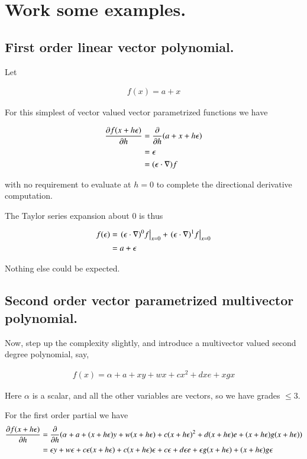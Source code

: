 \documentclass{article}
\begin{document}
\section{ Work some examples. }

\subsection{ First order linear vector polynomial. }

Let

\begin{align*}
f(x) = a + x
\end{align*}

For this simplest of vector valued vector parametrized functions we have

\begin{align*}
\PD{h}{f(x + h \epsilon)} 
&= \PD{h}{} (a + x + h \epsilon) \\
&= \epsilon \\
&= (\epsilon \cdot \grad) f
\end{align*}

with no requirement to evaluate at $h=0$ to complete the directional derivative computation.

The Taylor series expansion about $0$ is thus

\begin{align*}
f(\epsilon) 
&= \left. (\epsilon \cdot \grad)^0 f \right\vert_{x=0} + \left. (\epsilon \cdot \grad)^1 f  \right\vert_{x=0} \\
&= a + \epsilon \\
\end{align*}

Nothing else could be expected.

\subsection{ Second order vector parametrized multivector polynomial. }

Now, step up the complexity slightly, and introduce a multivector valued second degree polynomial, say,

\begin{align}\label{eqn:secondOrder}
f(x) = \alpha + a + x y + w x + c x^2 + d x e + x g x
\end{align}

Here $\alpha$ is a scalar, and all the other variables are vectors, so we have grades $\le 3$.

For the first order partial we have
\begin{align*}
\PD{h}{f(x + h \epsilon)} 
&= \PD{h}{} ( \alpha + a + (x + h\epsilon) y + w (x + h\epsilon) + c (x + h\epsilon)^2 + d (x + h\epsilon) e + (x + h\epsilon) g (x + h\epsilon) ) \\
&= 
\epsilon y 
+ w \epsilon
+ c \epsilon (x + h\epsilon) 
+ c (x + h\epsilon) \epsilon
+ c \epsilon 
+ d \epsilon e 
+ \epsilon g (x + h\epsilon) 
+ (x + h\epsilon) g \epsilon \\
\end{align*}
\end{document}
